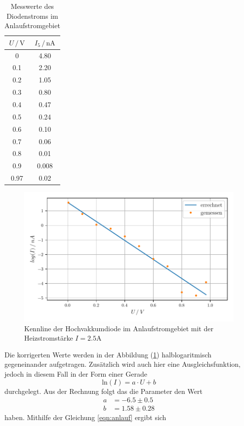 \begin{table}
  \centering
  \caption{Messwerte des Diodenstroms im Anlaufstromgebiet}
  \label{tab:mess2}
  \begin{tabular}{c c}
  \toprule
  $ U \,/\, \si{\volt} $ & $I_5 \,/\, \si{\nano\ampere}$\\
  \midrule 
  0    &  4.80 \\
  0.1  &  2.20 \\
  0.2  &  1.05 \\
  0.3  &  0.80 \\
  0.4  &  0.47 \\
  0.5  &  0.24 \\
  0.6  &  0.10 \\
  0.7  &  0.06 \\
  0.8  &  0.01 \\
  0.9  &  0.008 \\
  0.97 &  0.02 \\
  \bottomrule
  \end{tabular}
\end{table}


\begin{figure} [H]
    \centering
    \includegraphics{Daten/gegenfeld.pdf}
    \caption{Kennline der Hochvakkumdiode im Anlaufstromgebiet mit der Heizstromstärke $I = 2.5 \si{\ampere}$}
    \label{fig:3}
\end{figure}


Die korrigerten Werte werden in der Abbildung (\ref{fig:3}) halblogaritmisch gegeneinander aufgetragen. Zusätzlich wird auch hier eine Ausgleichsfunktion, jedoch in diesem Fall in der
Form einer Gerade 
\begin{equation*}
    \text{ln} \left(I \right) = a \cdot U + b
\end{equation*}
durchgelegt. Aus der Rechnung folgt das die Parameter den Wert
\begin{align*}
    a &= -6.5 \pm 0.5\\
    b &= 1.58 \pm 0.28
\end{align*}
haben. Mithilfe der Gleichung \eqref{eqn:anlauf} ergibt sich

